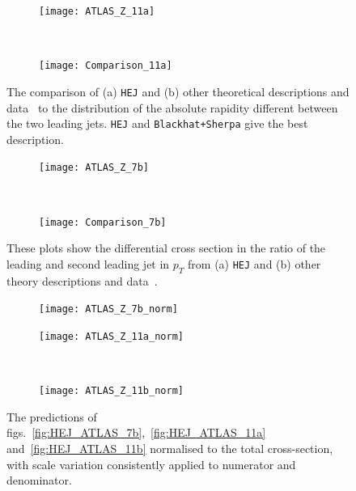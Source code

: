 		\begin{figure}[H]
		  \centering
		  \begin{subfigure}[b]{0.48\textwidth}
		    \texttt{[image: ATLAS\_Z\_11a]}
		    \caption{}
		    \label{fig:HEJ_ATLAS_11a}
		  \end{subfigure}
		  ~
		  \begin{subfigure}[b]{0.48\textwidth}
		    \texttt{[image: Comparison\_11a]}
		    \caption{}
		    \label{fig:MC_ATLAS_11a}
		  \end{subfigure}
		  \caption{The comparison of (a) \texttt{HEJ} and (b) other theoretical descriptions and
		    data~\cite{Aad:2013ysa} to
		    the distribution of the absolute rapidity different between the two leading
		    jets.  \texttt{HEJ} and \texttt{Blackhat+Sherpa} give the best description.}
		  \label{fig:ATLAS_11a}

		  \begin{subfigure}[b]{0.48\textwidth}
		    \texttt{[image: ATLAS\_Z\_7b]}
		    \caption{}
		    \label{fig:HEJ_ATLAS_7b}
		  \end{subfigure}
		  ~
		  \begin{subfigure}[b]{0.48\textwidth}
		    \texttt{[image: Comparison\_7b]}
		    \caption{}
		    \label{fig:MC_ATLAS_7b}
		  \end{subfigure}
		  \caption{These plots show the differential cross section in the ratio of the leading
		     and second leading jet in $p_T$ from (a) \texttt{HEJ} and (b) other
		    theory descriptions and data~\cite{Aad:2013ysa}.}
		  \label{fig:ATLAS_7b}
		\end{figure}

		\begin{figure}[H]

		  \centering

		  \begin{subfigure}[b]{0.48\textwidth}
		    \texttt{[image: ATLAS\_Z\_7b\_norm]}
		    \vspace{0.2cm}
		    \caption{}
		    \label{fig:ATLAS_Z_7b_norm}
		  \end{subfigure}

		  \begin{subfigure}[b]{0.48\textwidth}
		    \texttt{[image: ATLAS\_Z\_11a\_norm]}
		    \vspace{0.2cm}
		    \caption{}
		    \label{fig:ATLAS_Z_11a_norm}
		  \end{subfigure}
		  ~
		  \begin{subfigure}[b]{0.48\textwidth}
		    \texttt{[image: ATLAS\_Z\_11b\_norm]}
		    \caption{}
		    \label{fig:ATLAS_Z_11b_norm}
		  \end{subfigure}
		  \caption{The predictions of figs.~\eqref{fig:HEJ_ATLAS_7b},~\eqref{fig:HEJ_ATLAS_11a} and~\eqref{fig:HEJ_ATLAS_11b}
		  normalised to the total cross-section, with scale variation consistently applied to numerator and denominator.}

		  \label{fig:ATLAS_norm}
		\end{figure}

